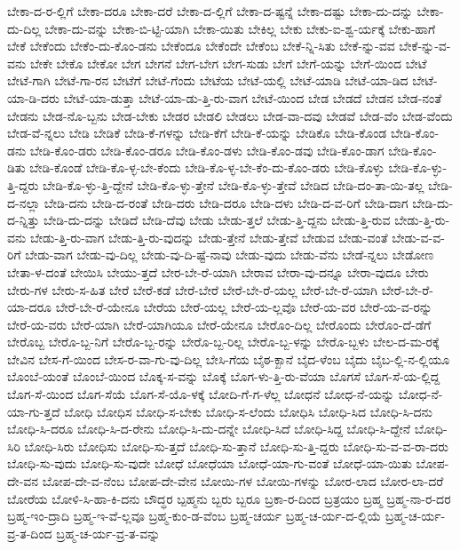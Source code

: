 {ಬೇಕಾ-ದ-ರ-ಲ್ಲಿಗೆ
ಬೇಕಾ-ದರೂ
ಬೇಕಾ-ದರೆ
ಬೇಕಾ-ದ-ಲ್ಲಿಗೆ
ಬೇಕಾ-ದ-ಷ್ಟನ್ನೆ
ಬೇಕಾ-ದಷ್ಟು
ಬೇಕಾ-ದು-ದನ್ನು
ಬೇಕಾ-ದು-ದಿಲ್ಲ
ಬೇಕಾ-ದು-ವನ್ನು
ಬೇಕಾ-ಬಿ-ಟ್ಟಿ-ಯಾಗಿ
ಬೇಕಾ-ಯಿತು
ಬೇಕಿಲ್ಲ
ಬೇಕು
ಬೇಕು-ಐ-ಶ್ವ-ರ್ಯಕ್ಕೆ
ಬೇಕು-ಹಾಗೆ
ಬೇಕೆ
ಬೇಕೆಂದು
ಬೇಕೆಂ-ದು-ಕೊಂ-ಡನು
ಬೇಕೆಂದೂ
ಬೇಕೆಂದೇ
ಬೇಕೆಂಬ
ಬೇಕೆ-ನ್ನಿ-ಸಿತು
ಬೇಕೆ-ನ್ನು-ವವ
ಬೇಕೆ-ನ್ನು-ವ-ವನು
ಬೇಕೇ
ಬೇಕೊ
ಬೇಕೋ
ಬೇಗ
ಬೇಗನೆ
ಬೇಗ-ಬೇಗ
ಬೇಗ-ಸುಡು
ಬೇಗೆ
ಬೇಗೆ-ಯನ್ನು
ಬೇಗೆ-ಯಿಂದ
ಬೇಟೆ
ಬೇಟೆ-ಗಾಗಿ
ಬೇಟೆ-ಗಾ-ರನ
ಬೇಟೆಗೆ
ಬೇಟೆ-ಗೆಂದು
ಬೇಟೆಯ
ಬೇಟೆ-ಯಲ್ಲಿ
ಬೇಟೆ-ಯಾಡಿ
ಬೇಟೆ-ಯಾ-ಡಿದ
ಬೇಟೆ-ಯಾ-ಡಿ-ದರು
ಬೇಟೆ-ಯಾ-ಡುತ್ತಾ
ಬೇಟೆ-ಯಾ-ಡು-ತ್ತಿ-ರು-ವಾಗ
ಬೇಟೆ-ಯಿಂದ
ಬೇಡ
ಬೇಡದೆ
ಬೇಡನ
ಬೇಡ-ನಂತೆ
ಬೇಡನು
ಬೇಡ-ನೊ-ಬ್ಬನು
ಬೇಡ-ಬೇಕು
ಬೇಡರ
ಬೇಡಲಿ
ಬೇಡಲು
ಬೇಡ-ವಾ-ದವು
ಬೇಡವೆ
ಬೇಡ-ವೆಂ
ಬೇಡ-ವೆಂದು
ಬೇಡ-ವೆ-ನ್ನಲು
ಬೇಡಿ
ಬೇಡಿಕೆ
ಬೇಡಿ-ಕೆ-ಗಳನ್ನು
ಬೇಡಿ-ಕೆಗೆ
ಬೇಡಿ-ಕೆ-ಯನ್ನು
ಬೇಡಿಕೊ
ಬೇಡಿ-ಕೊಂಡ
ಬೇಡಿ-ಕೊಂ-ಡನು
ಬೇಡಿ-ಕೊಂ-ಡರು
ಬೇಡಿ-ಕೊಂ-ಡರೂ
ಬೇಡಿ-ಕೊಂ-ಡಳು
ಬೇಡಿ-ಕೊಂ-ಡವು
ಬೇಡಿ-ಕೊಂ-ಡಾಗ
ಬೇಡಿ-ಕೊಂ-ಡಿತು
ಬೇಡಿ-ಕೊಂಡೆ
ಬೇಡಿ-ಕೊ-ಳ್ಳ-ಬೇ-ಕೆಂದು
ಬೇಡಿ-ಕೊ-ಳ್ಳ-ಬೇ-ಕೆಂ-ದು-ಕೊಂ-ಡರು
ಬೇಡಿ-ಕೊಳ್ಳು
ಬೇಡಿ-ಕೊ-ಳ್ಳು-ತ್ತಿ-ದ್ದರು
ಬೇಡಿ-ಕೊ-ಳ್ಳು-ತ್ತಿ-ದ್ದೇನೆ
ಬೇಡಿ-ಕೊ-ಳ್ಳು-ತ್ತೇನೆ
ಬೇಡಿ-ಕೊ-ಳ್ಳು-ತ್ತೇವೆ
ಬೇಡಿದ
ಬೇಡಿ-ದಂ-ತಾ-ಯಿ-ತಲ್ಲ
ಬೇಡಿ-ದ-ನಲ್ಲಾ
ಬೇಡಿ-ದನು
ಬೇಡಿ-ದ-ರಂತೆ
ಬೇಡಿ-ದರು
ಬೇಡಿ-ದರೂ
ಬೇಡಿ-ದಳು
ಬೇಡಿ-ದ-ವ-ರಿಗೆ
ಬೇಡಿ-ದಾಗ
ಬೇಡಿ-ದು-ದ-ನ್ನಿತ್ತು
ಬೇಡಿ-ದು-ದನ್ನು
ಬೇಡಿದೆ
ಬೇಡಿ-ದೆವು
ಬೇಡು
ಬೇಡು-ತ್ತಲೆ
ಬೇಡು-ತ್ತಿ-ದ್ದನು
ಬೇಡು-ತ್ತಿ-ರುವ
ಬೇಡು-ತ್ತಿ-ರು-ವನು
ಬೇಡು-ತ್ತಿ-ರು-ವಾಗ
ಬೇಡು-ತ್ತಿ-ರು-ವುದನ್ನು
ಬೇಡು-ತ್ತೇನೆ
ಬೇಡು-ತ್ತೇವೆ
ಬೇಡುವ
ಬೇಡು-ವಂತೆ
ಬೇಡು-ವ-ವ-ರಿಗೆ
ಬೇಡು-ವಾಗ
ಬೇಡು-ವು-ದಿಲ್ಲ
ಬೇಡು-ವು-ದಿ-ಷ್ಟೆ-ನಾವು
ಬೇಡು-ವುದು
ಬೇಡು-ವೆನು
ಬೇಡೆ-ನ್ನಲು
ಬೇಡೋಣ
ಬೇತಾ-ಳ-ದಂತೆ
ಬೇಯಿಸಿ
ಬೇಯು-ತ್ತದೆ
ಬೇರ-ಬೇ-ರೆ-ಯಾಗಿ
ಬೇರಾವ
ಬೇರಾ-ವು-ದನ್ನೂ
ಬೇರಾ-ವುದೂ
ಬೇರು
ಬೇರು-ಗಳ
ಬೇರು-ಸ-ಹಿತ
ಬೇರೆ
ಬೇರೆ-ಕಡೆ
ಬೇರೆ-ಬೇರೆ
ಬೇರೆ-ಬೇ-ರೆ-ಯಲ್ಲ
ಬೇರೆ-ಬೇ-ರೆ-ಯಾಗಿ
ಬೇರೆ-ಬೇ-ರೆ-ಯಾ-ದರೂ
ಬೇರೆ-ಬೇ-ರೆ-ಯೇನೂ
ಬೇರೆಯ
ಬೇರೆ-ಯಲ್ಲ
ಬೇರೆ-ಯ-ಲ್ಲವೊ
ಬೇರೆ-ಯ-ವರ
ಬೇರೆ-ಯ-ವ-ರನ್ನು
ಬೇರೆ-ಯ-ವರು
ಬೇರೆ-ಯಾಗಿ
ಬೇರೆ-ಯಾಗಿಯೂ
ಬೇರೆ-ಯೇನೂ
ಬೇರೊಂ-ದಿಲ್ಲ
ಬೇರೊಂದು
ಬೇರೊಂ-ದೆ-ಡೆಗೆ
ಬೇರೊಬ್ಬ
ಬೇರೊ-ಬ್ಬ-ನಿಗೆ
ಬೇರೊ-ಬ್ಬ-ರನ್ನು
ಬೇರೊ-ಬ್ಬ-ರಿಲ್ಲ
ಬೇರೊ-ಬ್ಬ-ಳನ್ನು
ಬೇರೊ-ಬ್ಬಳು
ಬೇಲ-ದ-ಮ-ರಕ್ಕೆ
ಬೇವಿನ
ಬೇಸ-ಗೆ-ಯಿಂದ
ಬೇಸ-ರ-ವಾ-ಗು-ವು-ದಿಲ್ಲ
ಬೇಸಿ-ಗೆಯ
ಬೈಠ-ಕ್ಖಾನೆ
ಬೈದ-ಳೆಂಬ
ಬೈದು
ಬೈಬ-ಲ್ಲಿ-ನ-ಲ್ಲಿಯೂ
ಬೊಂಬೆ-ಯಂತೆ
ಬೊಂಬೆ-ಯಿಂದ
ಬೊಕ್ಕ-ಸ-ವನ್ನು
ಬೊಕ್ಕೆ
ಬೊಗ-ಳು-ತ್ತಿ-ರು-ವೆಯಾ
ಬೊಗಸೆ
ಬೊಗ-ಸೆ-ಯ-ಲ್ಲಿದ್ದ
ಬೊಗ-ಸೆ-ಯಿಂದ
ಬೊಗ-ಸೆಯೆ
ಬೊಗ-ಸೆ-ಯೊ-ಳಕ್ಕೆ
ಬೋದಿ-ಗೆ-ಗ-ಳೆಲ್ಲ
ಬೋಧನೆ
ಬೋಧ-ನೆ-ಯನ್ನು
ಬೋಧ-ನೆ-ಯಾ-ಗು-ತ್ತದೆ
ಬೋಧಿ
ಬೋಧಿಸ
ಬೋಧಿ-ಸ-ಬೇಕು
ಬೋಧಿ-ಸ-ಲೆಂದು
ಬೋಧಿಸಿ
ಬೋಧಿ-ಸಿದ
ಬೋಧಿ-ಸಿ-ದನು
ಬೋಧಿ-ಸಿ-ದರೂ
ಬೋಧಿ-ಸಿ-ದ-ರೇನು
ಬೋಧಿ-ಸಿ-ದು-ದನ್ನೇ
ಬೋಧಿ-ಸಿದೆ
ಬೋಧಿ-ಸಿದ್ದ
ಬೋಧಿ-ಸಿ-ದ್ದೇನೆ
ಬೋಧಿ-ಸಿರಿ
ಬೋಧಿ-ಸಿರು
ಬೋಧಿಸು
ಬೋಧಿ-ಸು-ತ್ತದೆ
ಬೋಧಿ-ಸು-ತ್ತಾನೆ
ಬೋಧಿ-ಸು-ತ್ತಿ-ದ್ದರು
ಬೋಧಿ-ಸು-ವ-ವ-ರಾ-ದರು
ಬೋಧಿ-ಸು-ವುದು
ಬೋಧಿ-ಸು-ವುದೇ
ಬೋಧೆ
ಬೋಧೆಯಾ
ಬೋಧೆ-ಯಾ-ಗು-ವಂತೆ
ಬೋಧೆ-ಯಾ-ಯಿತು
ಬೋಪ-ದೇ-ವನ
ಬೋಪ-ದೇ-ವ-ನೆಂಬ
ಬೋಪ-ದೇ-ವೇನ
ಬೋಯಿ-ಗಳ
ಬೋಯಿ-ಗಳನ್ನು
ಬೋರ-ಲಾದ
ಬೋರ-ಲಾ-ದರೆ
ಬೋರೆಯ
ಬೋಳಿ-ಸಿ-ಹಾ-ಕಿ-ದನು
ಬೌದ್ಧರ
ಬ್ಪಹ್ಮನು
ಬ್ಬರು
ಬ್ಬರೂ
ಬ್ರಕಾ-ರ-ದಿಂದ
ಬ್ರತ್ರಯಂ
ಬ್ರಹ್ಮ
ಬ್ರಹ್ಮ-ನಾ-ರ-ದರ
ಬ್ರಹ್ಮ-ಇಂ-ದ್ರಾದಿ
ಬ್ರಹ್ಮ-ಇ-ವೆ-ಲ್ಲವೂ
ಬ್ರಹ್ಮ-ಕುಂ-ಡ-ವೆಂಬ
ಬ್ರಹ್ಮ-ಚರ್ಯ
ಬ್ರಹ್ಮ-ಚ-ರ್ಯ-ದ-ಲ್ಲಿಯೆ
ಬ್ರಹ್ಮ-ಚ-ರ್ಯ-ವ್ರ-ತ-ದಿಂದ
ಬ್ರಹ್ಮ-ಚ-ರ್ಯ-ವ್ರ-ತ-ವನ್ನು
}
